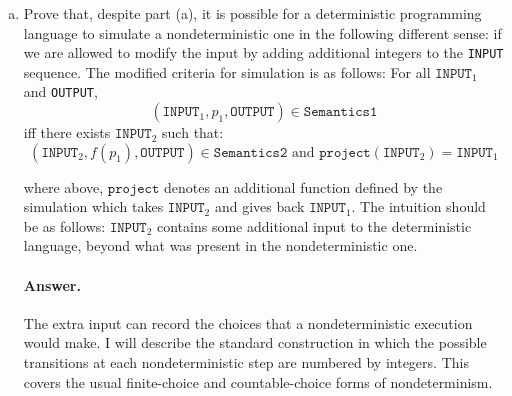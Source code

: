\documentclass{article}
\begin{document}
\begin{enumerate}
\begin{enumerate}[(a)]
Now define \texttt{Lang2} to have two forms of programs:
\[
\operatorname{Return}(n)
\qquad\text{and}\qquad
\operatorname{Choose}(a,b).
\]
The first form deterministically returns $[n]$.  The second may return either
$[a]$ or $[b]$.  More formally, its semantics contains
\[
\begin{aligned}
(I,\operatorname{Return}(n),[n])&\quad\text{for every }I,n,\\
(I,\operatorname{Choose}(a,b),[a])&\quad\text{for every }I,a,b,\\
(I,\operatorname{Choose}(a,b),[b])&\quad\text{for every }I,a,b.
\end{aligned}
\]
This language is nondeterministic: for example,
$\operatorname{Choose}(0,1)$ can produce either $[0]$ or $[1]$ on the same
input.

Define the translation by
\[
f(n)=\operatorname{Return}(n).
\]
For every input $I$ and output $O$,
\[
(I,n,O)\in\texttt{Semantics1}
\quad\Longleftrightarrow\quad O=[n]
\quad\Longleftrightarrow\quad
(I,\operatorname{Return}(n),O)\in\texttt{Semantics2}.
\]
Therefore \texttt{Lang2} simulates all of \texttt{Lang1}, even though
\texttt{Lang2} also contains other programs that behave nondeterministically.
The simulator does not have to use the nondeterministic feature when it is
translating a deterministic program.

\item
Prove that, despite part (a), it is possible for a deterministic programming language to simulate a nondeterministic
one in the following different sense:
if we are allowed to modify the input by adding additional integers to the \texttt{INPUT} sequence.
The modified criteria for simulation is as follows:
For all $\texttt{INPUT}_1$ and \texttt{OUTPUT},
$$
(\texttt{INPUT}_1, p_1, \texttt{OUTPUT}) \in \texttt{Semantics1}
$$
iff there exists $\texttt{INPUT}_2$ such that:
$$
(\texttt{INPUT}_2, f(p_1), \texttt{OUTPUT}) \in \texttt{Semantics2} \text{ and } \texttt{project}(\texttt{INPUT}_2) = \texttt{INPUT}_1
$$

where above, $\texttt{project}$ denotes an additional function defined by the simulation which takes
$\texttt{INPUT}_2$ and gives back $\texttt{INPUT}_1$.
The intuition should be as follows:
$\texttt{INPUT}_2$ contains some additional input to the deterministic language, beyond what was present in the nondeterministic one.

\paragraph{Answer.}
The extra input can record the choices that a nondeterministic execution
would make.  I will describe the standard construction in which the possible
transitions at each nondeterministic step are numbered by integers.  This
covers the usual finite-choice and countable-choice forms of nondeterminism.


\end{enumerate}
\end{enumerate}
\end{document}
